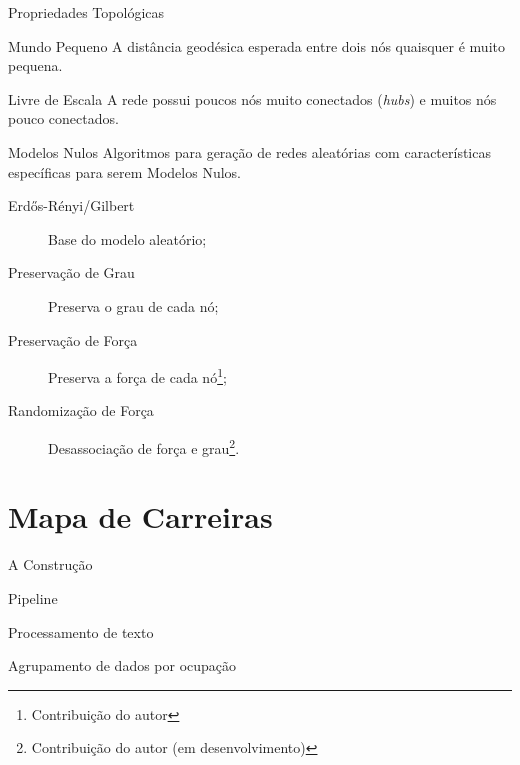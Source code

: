 \documentclass[10pt, hyperref={pdfpagelabels=false, unicode=true}, aspectratio=169]{beamer}
\begin{document}
\begin{frame}[label=propriedades]{Propriedades Topológicas}
  \large
  \begin{alertblock}{\Large Mundo Pequeno}
    A distância geodésica esperada entre dois nós quaisquer é muito pequena.
  \end{alertblock}
  \begin{alertblock}{\Large Livre de Escala}
    A rede possui poucos nós muito conectados (\textit{hubs}) e muitos nós pouco conectados.
  \end{alertblock}
\end{frame}

\begin{frame}[c,label=modelos-nulos]{Modelos Nulos}
  Algoritmos para geração de redes aleatórias com características específicas para serem \alert{Modelos Nulos}.
  \begin{description}
    \item[Erdős-Rényi/Gilbert] Base do modelo aleatório;
    \item[Preservação de Grau] Preserva o grau de cada nó;
    \item[Preservação de Força] Preserva a força de cada nó\footnote{Contribuição do autor};
    \item[Randomização de Força] Desassociação de força e grau\footnote{Contribuição do autor (em desenvolvimento)}.
  \end{description}
\end{frame}

\section{Mapa de Carreiras}

\begin{frame}[label=mapa-construcao]{A Construção}
  \begin{center}
    \Large
    Pipeline
    
    Processamento de texto
    
    Agrupamento de dados por ocupação
  \end{center}
\end{frame}
\end{document}
